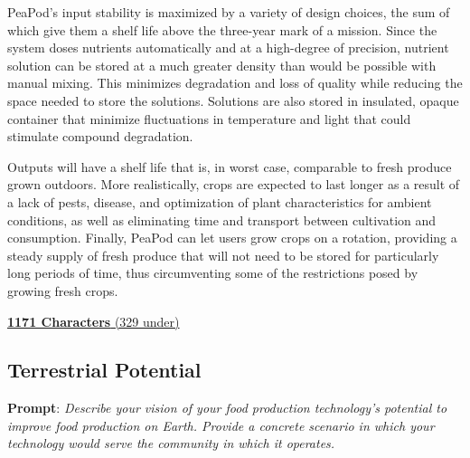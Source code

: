 \documentclass{report}
\begin{document}

PeaPod's input stability is maximized by a variety of design choices, the sum of which give them a shelf life above the three-year mark of a mission. Since the system doses nutrients automatically and at a high-degree of precision, nutrient solution can be stored at a much greater density than would be possible with manual mixing. This minimizes degradation and loss of quality while reducing the space needed to store the solutions. Solutions are also stored in insulated, opaque container that minimize fluctuations in temperature and light that could stimulate compound degradation.

Outputs will have a shelf life that is, in worst case, comparable to fresh produce grown outdoors. More realistically, crops are expected to last longer as a result of a lack of pests, disease, and optimization of plant characteristics for ambient conditions, as well as eliminating time and transport between cultivation and consumption. Finally, PeaPod can let users grow crops on a rotation, providing a steady supply of fresh produce that will not need to be stored for particularly long periods of time, thus circumventing some of the restrictions posed by growing fresh crops.

\uline{\textbf{1171 Characters} (329 under)}


\subsection{Terrestrial Potential}
\label{sec:terrestrial}

\textbf{Prompt}: \textit{Describe your vision of your food production technology’s potential to improve food production on Earth. Provide a concrete scenario in which your technology would serve the community in which it operates.}


\end{document}
